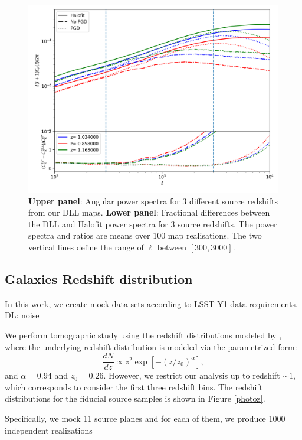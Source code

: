 \documentclass[twocolumn,twocolappendix]{aastex63}
\newcommand{\denise}[1]{{\color{red}DL: #1}}
\begin{document}
\begin{figure}
    \centering
    \includegraphics[width=\columnwidth]{paper/figures/clshalofit_comp.png}
    \caption{
    \textbf{Upper panel}: Angular power spectra for 3 different source redshifts from
our DLL maps. \textbf{Lower panel}: Fractional differences between the
DLL and Halofit power spectra for 3 source redshifts. The power spectra and ratios are means over 100 map realisations. The two vertical lines define the range of $\ell$ between $[300,3000]$.}
    \label{fig:ps_comp}
\end{figure}

\subsection{Galaxies Redshift distribution}
In this work, we create mock data sets according to LSST Y1 data requirements.
\denise{noise}

We perform tomographic study using the redshift distributions modeled by \cite{zhang2021transitioning}, where the underlying redshift distribution is modeled via the parametrized form:
\begin{equation}\label{photz}
    \frac{dN}{dz} \propto z^{2} \exp{[-(z/z_0)^{\alpha}]},
\end{equation}
and $\alpha=0.94$ and $z_0=0.26$.
However, we restrict our analysis up to redshift $\sim 1$, which corresponds to consider the first three redshift bins. 
The redshift distributions for the fiducial source samples is shown in Figure \ref{photoz}. 

Specifically, we mock 11 source planes and for each of them, we produce 1000 independent realizations 
\end{document}

